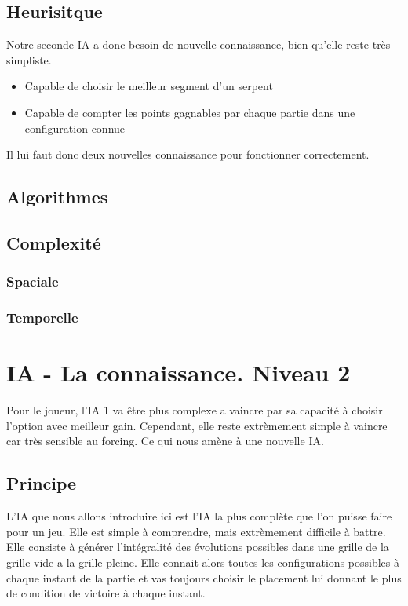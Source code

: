 \documentclass[a4paper,12pt]{report}
\begin{document}
\subsection{Heurisitque}

Notre seconde IA a donc besoin de nouvelle connaissance, bien qu'elle reste tr\`es simpliste.

\begin{itemize}
 \item Capable de choisir le meilleur segment d'un serpent
 \item Capable de compter les points gagnables par chaque partie dans une configuration connue
\end{itemize}

Il lui faut donc deux nouvelles connaissance pour fonctionner correctement.
\subsection{Algorithmes}

\subsection{Complexit\'e}

\subsubsection{Spaciale}

\subsubsection{Temporelle}

\section{IA - La connaissance. Niveau 2}

Pour le joueur, l'IA 1 va \^etre plus complexe a vaincre par sa capacit\'e \`a choisir l'option avec meilleur gain. Cependant, elle reste extr\`emement simple \`a vaincre car tr\`es sensible au forcing. Ce qui nous am\`ene \`a une nouvelle IA. 

\subsection{Principe}

L'IA que nous allons introduire ici est l'IA la plus compl\`ete que l'on puisse faire pour un jeu. Elle est simple \`a comprendre, mais extr\`emement difficile \`a battre. Elle consiste \`a g\'en\'erer l'int\'egralit\'e des \'evolutions possibles dans une grille de la grille vide a la grille pleine. Elle connait alors toutes les configurations possibles \`a chaque instant de la partie et vas toujours choisir le placement lui donnant le plus de condition de victoire \`a chaque instant.
\end{document}
